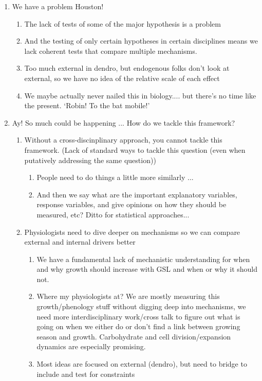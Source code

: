 \documentclass[11pt,letter]{article}
\begin{document}
\begin{enumerate}
\begin {enumerate}
\begin {enumerate}
\end{enumerate}
\end{enumerate}
\item We have a problem Houston!
\begin {enumerate}
\item The lack of tests of some of the major hypothesis is a problem
\item And the testing of only certain hypotheses in certain disciplines means we lack coherent tests that compare multiple mechanisms. 
\item Too much external in dendro, but endogenous folks don't look at external, so we have no idea of the relative scale of each effect
\item We maybe actually never nailed this in biology.... but there's no time like the present. `Robin! To the bat mobile!'
\end{enumerate}
\item Ay! So much could be happening ... How do we tackle this framework?
\begin{enumerate}
\item Without a cross-discinplinary approach, you cannot tackle this framework. (Lack of standard ways to tackle this question (even when putatively addressing the same question))
\begin{enumerate}
\item People need to do things a little more similarly ...
\item And then we say what are the important explanatory variables, response variables, and give opinions on how they should be measured, etc? Ditto for statistical approaches...
\end{enumerate}
\item Physiologists need to dive deeper on mechanisms so we can compare external and internal drivers better
\begin{enumerate}
\item We have a fundamental lack of mechanistic understanding for when and why growth should increase with GSL and when or why it should not. 
\item Where my physiologists at? We are mostly measuring this growth/phenology stuff without digging deep into mechanisms, we need more interdisciplinary work/cross talk to figure out what is going on when we either do or don't find a link between growing season and growth. Carbohydrate and cell division/expansion dynamics are especially promising.
\item Most ideas are focused on external (dendro), but need to bridge to include and test for constraints

\end{enumerate}
\end{enumerate}
\end{enumerate}
\end{document}
